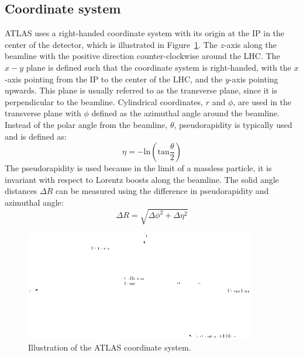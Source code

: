 \subsection{Coordinate system}


ATLAS uses a right-handed coordinate system with its origin at the IP in the center of the detector, which is illustrated in Figure~\ref{fig:atlas-coord}. The $z$-axis along the beamline with the positive direction counter-clockwise around the LHC. The $x-y$ plane is defined such that the coordinate system is right-handed, with the $x$-axis pointing from the IP to the center of the LHC, and the $y$-axis pointing upwards. This plane is usually referred to as the transverse plane, since it is perpendicular to the beamline. Cylindrical coordinates, $r$ and $\phi$, are used in the transverse plane with $\phi$ defined as the azimuthal angle around the beamline. Instead of the polar angle from the beamline, $\theta$, pseudorapidity is typically used and is defined as:
\begin{equation}
\eta = -\text{ln}(\text{tan}\frac{\theta}{2})
\label{eq:eta}
\end{equation}
The pseudorapidity is used because in the limit of a massless particle, it is invariant with respect to Lorentz boosts along the beamline. The solid angle distances $\Delta R$ can be measured using the difference in pseudorapidity and azimuthal angle:
\begin{equation}
\Delta R = \sqrt{\Delta \phi^2 + \Delta \eta^2}
\label{eq:dR}
\end{equation}


\begin{figure}[tp]
  \centering
  \includegraphics[width=0.90\textwidth]{fig/atlas/coord}
  \caption{Illustration of the ATLAS coordinate system\cite{Schott:2014sea}.}
  \label{fig:atlas-coord}
\end{figure}



